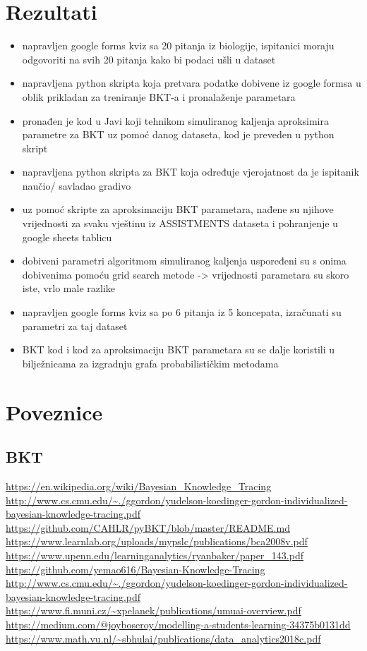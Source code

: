\section{Rezultati}
\begin{itemize}
	\item napravljen google forms kviz sa 20 pitanja iz biologije, ispitanici moraju odgovoriti na svih 20 pitanja kako bi podaci ušli u dataset
	\item napravljena python skripta koja pretvara podatke dobivene iz google formsa u oblik prikladan za treniranje BKT-a i pronalaženje parametara
	\item pronađen je kod u Javi koji tehnikom simuliranog kaljenja aproksimira parametre za BKT uz pomoć danog dataseta, kod je preveden u python skript
	\item napravljena python skripta za BKT koja određuje vjerojatnost da je ispitanik naučio/  savladao gradivo
	\item uz pomoć skripte za aproksimaciju BKT parametara, nađene su njihove vrijednosti za svaku vještinu iz ASSISTMENTS dataseta i pohranjenje u google sheets tablicu
	\item dobiveni parametri algoritmom simuliranog kaljenja uspoređeni su s onima dobivenima pomoću grid search metode -> vrijednosti parametara su skoro iste, vrlo male razlike
	\item napravljen google forms kviz sa po 6 pitanja iz 5 koncepata, izračunati su parametri za taj dataset
	\item BKT kod i kod za aproksimaciju BKT parametara su se dalje koristili u bilježnicama za izgradnju grafa probabilističkim metodama
	
\end{itemize}
\section{Poveznice}
\subsection{BKT}
\url{https://en.wikipedia.org/wiki/Bayesian_Knowledge_Tracing}\newline
\url{http://www.cs.cmu.edu/~./ggordon/yudelson-koedinger-gordon-individualized-bayesian-knowledge-tracing.pdf}\newline
\url{https://github.com/CAHLR/pyBKT/blob/master/README.md}\newline
\url{https://www.learnlab.org/uploads/mypslc/publications/bca2008v.pdf}\newline
\url{https://www.upenn.edu/learninganalytics/ryanbaker/paper_143.pdf}\newline
\url{https://github.com/yemao616/Bayesian-Knowledge-Tracing}\newline
\url{http://www.cs.cmu.edu/~./ggordon/yudelson-koedinger-gordon-individualized-bayesian-knowledge-tracing.pdf}\newline
\url{https://www.fi.muni.cz/~xpelanek/publications/umuai-overview.pdf}\newline
\url{https://medium.com/@joyboseroy/modelling-a-students-learning-34375b0131dd}\newline
\url{https://www.math.vu.nl/~sbhulai/publications/data_analytics2018c.pdf}\newline
